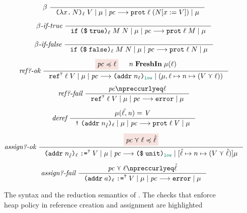 \begin{figure}[tbp]
{\begin{gather*}
  \\[1ex]
  \beta~
  \inference{}{\reduce{\dynlam{x}{N}{\ell} \; V}{\mu}{\pc}{\dynprot{\ell}{(N [x := V])}}{\mu}}
  \\[1ex]
  \beta\textit{-if-true}~
  \inference{}{\reduce{\dynif{\dynconst{\true}{\ell}}{M}{N}}{\mu}{\pc}{\dynprot{\ell}{M}}{\mu}}
  \\[1ex]
  \beta\textit{-if-false}~
  \inference{}{\reduce{\dynif{\dynconst{\false}{\ell}}{M}{N}}{\mu}{\pc}{\dynprot{\ell}{N}}{\mu}}
  \\[1ex]
  \textit{ref?-ok}~
  \inference
  {\highlightred{\pc \preccurlyeq \ell} & n \; \mathbf{FreshIn} \; \mu(\ell)}
  {\reduce{\dynref{?}{\ell}{V}}{\mu}{\pc}{\dynaddr{n_{\ell}}{\low}}{(\mu, \ell \mapsto n \mapsto (V \curlyvee \ell))}}
  \\[1ex]
  \textit{ref?-fail}~
  \inference
  {\pc \npreccurlyeq \ell}
  {\reduce{\dynref{?}{\ell}{V}}{\mu}{\pc}{\key{error}}{\mu}}
  \\[1ex]
  \textit{deref}~
  \inference
  {\mathit{\mu(\hat{\ell},n) = V}}
  {\reduce{\dynderef{\dynaddr{n_{\hat{\ell}}}{\ell}}}{\mu}{\pc}{\dynprot{\ell}{V}}{\mu}}
  \\[1ex]
  \textit{assign?-ok}~
  \inference
  {\highlightred{\pc \curlyvee \ell \preccurlyeq \hat{\ell}}}
  {\reduce{\dynassign{\dynaddr{n_{\hat{\ell}}}{\ell}}{?}{V}}{\mu}{\pc}{\dynconst{\unit}{\low}}{[\hat{\ell} \mapsto n \mapsto (V \curlyvee \hat{\ell})] \mu}}
  \\[1ex]
  \textit{assign?-fail}~
  \inference
  {\pc \curlyvee \ell \npreccurlyeq \hat{\ell}}
  {\reduce{\dynassign{\dynaddr{a}{\ell}}{?}{V}}{\mu}{\pc}{\key{error}}{\mu}}
  \end{gather*}}
  \caption{The syntax and the reduction semantics of \DynIFC. The checks that
    enforce heap policy in reference creation and assignment are highlighted}
  \label{fig:dyn-ifc}
\end{figure}
